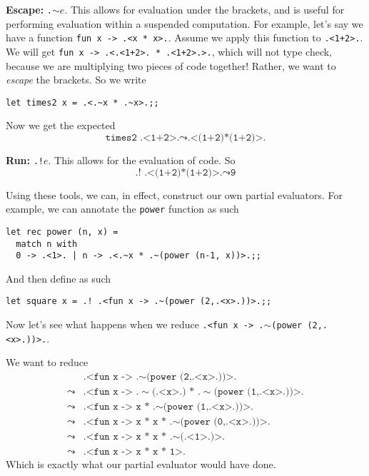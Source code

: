\textbf{Escape:} \texttt{.{$\sim$}}$e$. This allows for evaluation under the brackets, and is useful for performing evaluation within a suspended computation. For example, let's say we have a function \texttt{fun x -> .<x * x>.}. Assume we apply this function to \texttt{.<1+2>.}. We will get \texttt{fun x -> .<.<1+2>. * .<1+2>.>.}, which will not type check, because we are multiplying two pieces of code together! Rather, we want to \textit{escape} the brackets. So we write
\begin{verbatim}
let times2 x = .<.~x * .~x>.;;
\end{verbatim}
Now we get the expected
\[\texttt{times2 .<1+2>.} \leadsto \texttt{.<(1+2)*(1+2)>.}\]

\textbf{Run:} \texttt{.!}$e$. This allows for the evaluation of code. So 
\[\texttt{.! .<(1+2)*(1+2)>.} \leadsto \texttt{9}\]

Using these tools, we can, in effect, construct our own partial evaluators. For example, we can annotate the \texttt{power} function as such

\begin{verbatim}
let rec power (n, x) =
  match n with
  0 -> .<1>. | n -> .<.~x * .~(power (n-1, x))>.;;
\end{verbatim}

And then define as such
\begin{verbatim}
let square x = .! .<fun x -> .~(power (2,.<x>.))>.;;
\end{verbatim}

Now let's see what happens when we reduce \texttt{.<fun x -> .{$\sim$}(power (2,.<x>.))>.}.

We want to reduce
\[
\begin{array}{rl}
     &\texttt{.<fun x -> .{$\sim$}(power (2,.<x>.))>.}\\
     \leadsto&\texttt{.<fun x -> .{$\sim$}(.<x>.) * .{$\sim$}(power (1,.<x>.))>.}  \\
     \leadsto&\texttt{.<fun x -> x * .{$\sim$}(power (1,.<x>.))>.}\\
     \leadsto&\texttt{.<fun x -> x * x * .{$\sim$}(power (0,.<x>.))>.}\\
     \leadsto&\texttt{.<fun x -> x * x * .{$\sim$}(.<1>.)>.}\\
     \leadsto&\texttt{.<fun x -> x * x * 1>.}
\end{array}
\]
Which is exactly what our partial evaluator would have done.